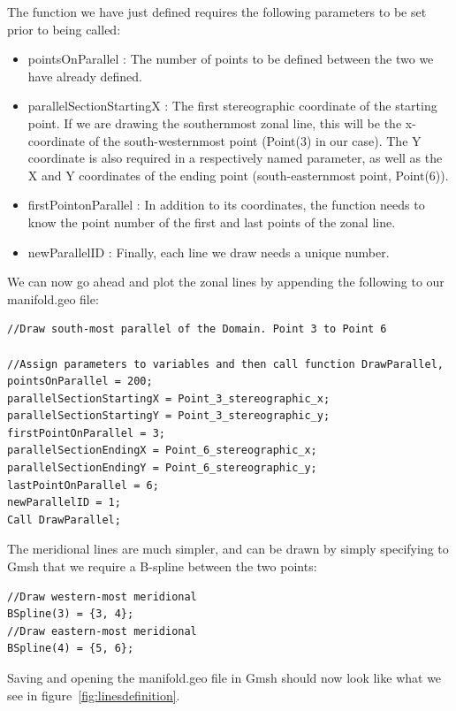 The function we have just defined requires the following parameters to be set prior to being called:
\begin{itemize}
\item pointsOnParallel : The number of points to be defined between the two we have already defined.
\item parallelSectionStartingX : The first stereographic coordinate of the starting point. If we are drawing the southernmost zonal line, this will be the x-coordinate of the south-westernmost point (Point(3) in our case). The Y coordinate is also required in a respectively named parameter, as well as the X and Y coordinates of the ending point (south-easternmost point, Point(6)).
\item firstPointonParallel : In addition to its coordinates, the function needs to know the point number of the first and last points of the zonal line.
\item newParallelID : Finally, each line we draw needs a unique number.
\end{itemize}

We can now go ahead and plot the zonal lines by appending the following to our manifold.geo file:

\begin{lstlisting}
//Draw south-most parallel of the Domain. Point 3 to Point 6

//Assign parameters to variables and then call function DrawParallel,
pointsOnParallel = 200;
parallelSectionStartingX = Point_3_stereographic_x;
parallelSectionStartingY = Point_3_stereographic_y;
firstPointOnParallel = 3;
parallelSectionEndingX = Point_6_stereographic_x;
parallelSectionEndingY = Point_6_stereographic_y;
lastPointOnParallel = 6;
newParallelID = 1;
Call DrawParallel;
\end{lstlisting}

The meridional lines are much simpler, and can be drawn by simply specifying to Gmsh that we require a B-spline between the two points:

\begin{lstlisting}
//Draw western-most meridional
BSpline(3) = {3, 4};
//Draw eastern-most meridional
BSpline(4) = {5, 6};
\end{lstlisting}

Saving and opening the manifold.geo file in Gmsh should now look like what we see in figure~\ref{fig:linesdefinition}.

